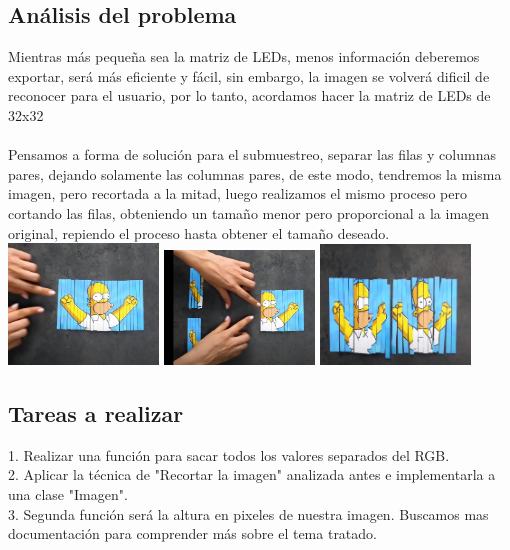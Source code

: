 \documentclass{article}
\begin{document}
\subsection{Análisis del problema}
Mientras más pequeña sea la matriz de LEDs, menos información deberemos exportar, será más eficiente y fácil, sin embargo, la imagen se volverá dificil de reconocer para el usuario, por lo tanto, acordamos hacer la matriz de LEDs de 32x32\\
\\Pensamos a forma de solución para el submuestreo, separar las filas y columnas pares, dejando solamente las columnas pares, de este modo, tendremos la misma imagen, pero recortada a la mitad, luego realizamos el mismo proceso pero cortando las filas, obteniendo un tamaño menor pero proporcional a la imagen original, repiendo el proceso hasta obtener el tamaño deseado.\\
\includegraphics[width=4cm]{Imagenes/recorte1.jpeg}
\includegraphics[width=4cm]{Imagenes/recorte2.jpeg}
\includegraphics[width=4cm]{Imagenes/recorte3.jpeg}


\subsection{Tareas a realizar}
1. Realizar una función para sacar todos los valores separados del RGB.\\
2. Aplicar la técnica de "Recortar la imagen" analizada antes e implementarla a una clase "Imagen".\\
3. Segunda función será la altura en pixeles de nuestra imagen. Buscamos mas documentación para comprender más sobre el tema tratado.\\
\end{document}
